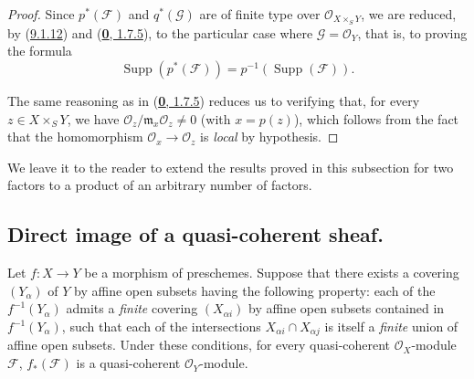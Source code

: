 \begin{proof}
Since $p^*(\mathscr{F})$ and $q^*(\mathscr{G})$ are of finite type over
$\mathscr{O}_{X\times_S Y}$, we are reduced, by
(\hyperref[I.9.1.12]{9.1.12}) and
(\hyperref[0.1.7.5]{\textbf{0}, 1.7.5}), to the particular case where
$\mathscr{G}=\mathscr{O}_Y$, that is, to proving the formula
\[
  \operatorname{Supp}(p^*(\mathscr{F}))
  =p^{-1}(\operatorname{Supp}(\mathscr{F})).
  \tag{9.1.13.1}\label{I.9.1.13.1}
\]

The same reasoning as in (\hyperref[0.1.7.5]{\textbf{0}, 1.7.5}) reduces us to
verifying that, for every $z\in X\times_S Y$, we have
$\mathscr{O}_z/\mathfrak{m}_x\mathscr{O}_z\neq0$ (with $x=p(z)$), which
follows from the fact that the homomorphism
$\mathscr{O}_x\to\mathscr{O}_z$ is \emph{local} by hypothesis.
\end{proof}

We leave it to the reader to extend the results proved in this subsection
for two factors to a product of an arbitrary number of factors.

\subsection{Direct image of a quasi-coherent sheaf.}
\label{subsection:I.9.2}

\begin{proposition}[9.2.1]
\label{I.9.2.1}
Let $f:X\to Y$ be a morphism of preschemes. Suppose that there exists a
covering $(Y_\alpha)$ of $Y$ by affine open subsets having the following
property: each of the $f^{-1}(Y_\alpha)$ admits a \emph{finite} covering
$(X_{\alpha i})$ by affine open subsets contained in
$f^{-1}(Y_\alpha)$, such that each of the intersections
$X_{\alpha i}\cap X_{\alpha j}$ is itself a \emph{finite} union of affine open
subsets. Under these conditions, for every quasi-coherent
$\mathscr{O}_X$-module $\mathscr{F}$, $f_*(\mathscr{F})$ is a
quasi-coherent $\mathscr{O}_Y$-module.
\end{proposition}

